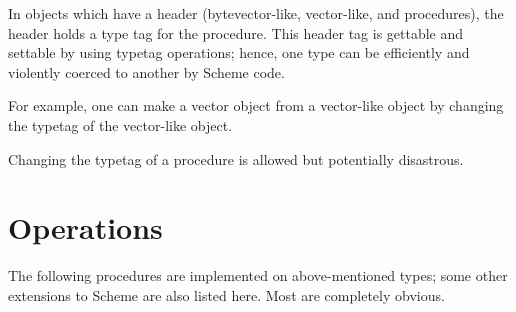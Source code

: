 In objects which have a header (bytevector-like, vector-like, and procedures),
the header holds a type tag for the procedure. This header tag is gettable
and settable by using typetag operations; hence, one type can be efficiently
and violently coerced to another by Scheme code.

For example, one can make a vector object from a vector-like object by 
changing the typetag of the vector-like object.

Changing the typetag of a procedure is allowed but potentially disastrous.

\section{Operations}

The following procedures are implemented on above-mentioned types; some other
extensions to Scheme are also listed here. Most are completely obvious.

